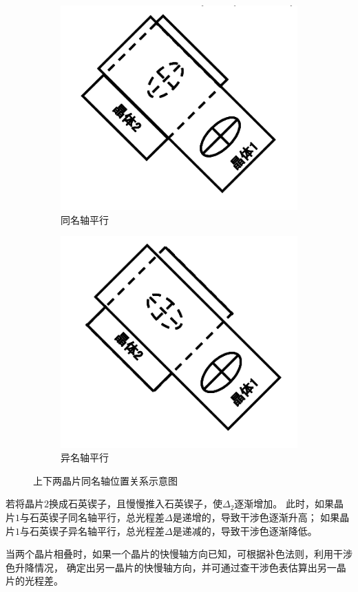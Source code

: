 \documentclass[11pt,a4paper]{article}
\begin{document}
\begin{spacing}{1.3}
\begin{CJK*}{UTF8}{gbsn}
\begin{figure}[htbp]
\begin{subfigure}[b]{0.5\textwidth}
\includegraphics[width=\linewidth]{fig4-1-7a}
\caption{同名轴平行}
\label{fig:4-1-7a}
\end{subfigure}
\begin{subfigure}[b]{0.5\textwidth}
\includegraphics[width=\linewidth]{fig4-1-7b}
\caption{异名轴平行}
\label{fig:4-1-7b}
\end{subfigure}
\caption{上下两晶片同名轴位置关系示意图}\label{fig:4-1-7}
\end{figure} 
若将晶片$2$换成石英锲子，且慢慢推入石英锲子，使$\Delta_2$逐渐增加。
此时，如果晶片$1$与石英锲子同名轴平行，总光程差$\Delta$是递增的，导致干涉色逐渐升高；
如果晶片$1$与石英锲子异名轴平行，总光程差$\Delta$是递减的，导致干涉色逐渐降低。\par
当两个晶片相叠时，如果一个晶片的快慢轴方向已知，可根据补色法则，利用干涉色升降情况，
确定出另一晶片的快慢轴方向，并可通过查干涉色表估算出另一晶片的光程差。


\end{CJK*}
\end{spacing}
\end{document}
